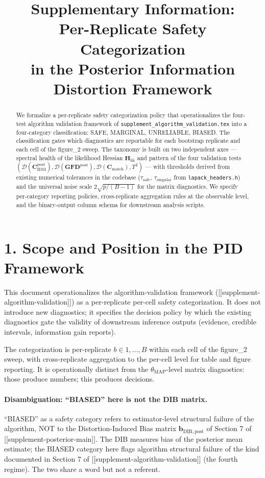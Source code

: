 \documentclass[11pt]{article}
\title{Supplementary Information:\\
Per-Replicate Safety Categorization\\
in the Posterior Information Distortion Framework}
\author{}
\date{}
\begin{document}
\maketitle

\begin{abstract}
\noindent We formalize a per-replicate safety categorization policy that
operationalizes the four-test algorithm validation framework of
\texttt{supplement\_algorithm\_validation.tex} into a four-category
classification: SAFE, MARGINAL, UNRELIABLE, BIASED. The classification
gates which diagnostics are reportable for each bootstrap replicate
and each cell of the figure\_2 sweep. The taxonomy is built on two
independent axes --- spectral health of the likelihood Hessian
$\mathbf H_{\mathrm{lik}}$ and pattern of the four validation tests
$(\mathcal D(\mathbf C_{\mathrm{IDM}}^{\mathrm{post}}),
\mathcal D(\mathbf{GFD}^{\mathrm{post}}),
\mathcal D(\mathbf C_{\mathrm{match}}), T^2)$ --- with thresholds
derived from existing numerical tolerances in the codebase
($\tau_{\mathrm{safe}}$, $\tau_{\mathrm{singular}}$ from
\texttt{lapack\_headers.h}) and the universal noise scale
$2\sqrt{p/(B-1)}$ for the matrix diagnostics. We specify per-category
reporting policies, cross-replicate aggregation rules at the
observable level, and the binary-output column schema for downstream
analysis scripts.
\end{abstract}

\section*{1. Scope and Position in the PID Framework}
\label{sec:sc-scope}

This document operationalizes the algorithm-validation framework
([[supplement-algorithm-validation]]) as a per-replicate per-cell
safety categorization. It does not introduce new diagnostics; it
specifies the decision policy by which the existing diagnostics gate
the validity of downstream inference outputs (evidence, credible
intervals, information gain reports).

The categorization is per-replicate $b \in 1,\ldots,B$ within each
cell of the figure\_2 sweep, with cross-replicate aggregation to the
per-cell level for table and figure reporting. It is operationally
distinct from the $\theta_{\mathrm{MAP}}$-level matrix diagnostics:
those produce numbers; this produces decisions.

\paragraph{Disambiguation: ``BIASED'' here is not the DIB matrix.}
``BIASED'' as a safety category refers to estimator-level structural
failure of the algorithm, NOT to the Distortion-Induced Bias matrix
$\mathbf b_{\mathrm{DIB},\mathrm{post}}$ of Section 7 of
[[supplement-posterior-main]]. The DIB measures bias of the posterior
mean estimate; the BIASED category here flags algorithm structural
failure of the kind documented in Section 7 of
[[supplement-algorithm-validation]] (the fourth regime). The two
share a word but not a referent.
\end{document}
